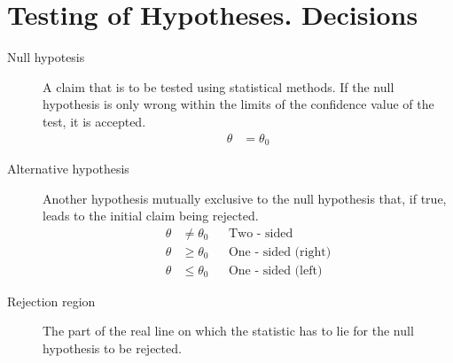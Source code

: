 \section{Testing of Hypotheses. Decisions}

\begin{description}
    \item[Null hypotesis] A claim that is to be tested using statistical methods. If the
          null hypothesis is only wrong within the limits of the confidence value of
          the test, it is accepted.
          \begin{align}
              \theta & = \theta_0
          \end{align}
    \item[Alternative hypothesis] Another hypothesis mutually exclusive to the null
          hypothesis that, if true, leads to the initial claim being rejected.
          \begin{align}
              \theta & \neq \theta_0 &  & \text{Two - sided}         \\
              \theta & \geq \theta_0 &  & \text{One - sided (right)} \\
              \theta & \leq \theta_0 &  & \text{One - sided (left)}
          \end{align}

    \item[Rejection region] The part of the real line on which the statistic has to
          lie for the null hypothesis to be rejected.
          \begin{figure}[H]
              \centering
          \end{figure}


\end{description}
